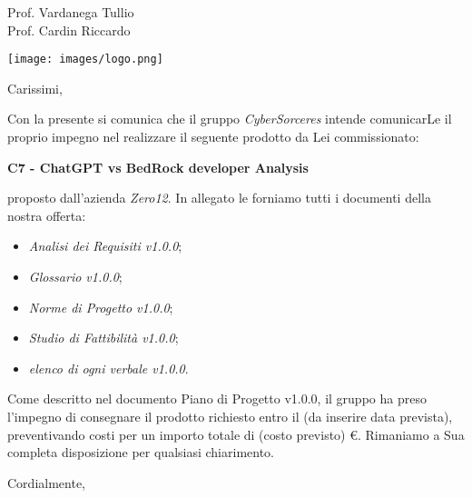 \documentclass[12pt]{letter}
\date{6 Novembre 2023}
\begin{document}
\begin{letter}
{
	Prof. Vardanega Tullio \\
 	Prof. Cardin Riccardo
}



\texttt{[image: images/logo.png]}

\opening{Carissimi,}

Con la presente si comunica che il gruppo
\textit{CyberSorceres} intende comunicarLe il proprio 
impegno nel realizzare il seguente prodotto da Lei
commissionato:

\textbf{C7 - ChatGPT vs BedRock developer Analysis}

proposto dall'azienda \textit{Zero12}. In allegato 
le forniamo tutti i documenti della nostra offerta:

\begin{itemize}
	\item \textit{Analisi dei Requisiti v1.0.0};
	\item \textit{Glossario v1.0.0};
	\item \textit{Norme di Progetto v1.0.0};
	\item \textit{Studio di Fattibilità v1.0.0};
	\item \textit{elenco di ogni verbale v1.0.0}.
\end{itemize}

Come descritto nel documento Piano di Progetto v1.0.0,
il gruppo ha preso l'impegno di consegnare il prodotto richiesto entro il (da inserire data prevista), preventivando costi per un importo totale di (costo previsto) €.
Rimaniamo a Sua completa disposizione per qualsiasi chiarimento.


\closing{Cordialmente,}

\end{letter}
\end{document}
